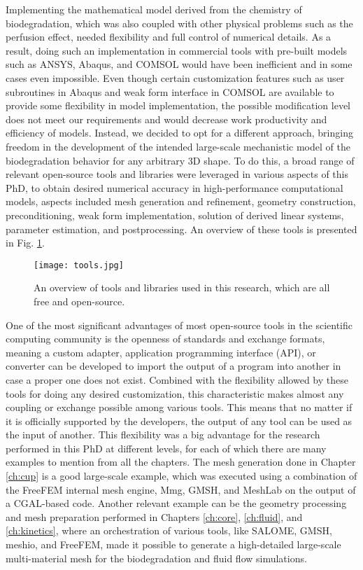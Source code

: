 Implementing the mathematical model derived from the chemistry of biodegradation, which was also coupled with other physical problems such as the perfusion effect, needed flexibility and full control of numerical details. As a result, doing such an implementation in commercial tools with pre-built models such as ANSYS, Abaqus, and COMSOL would have been inefficient and in some cases even impossible. Even though certain customization features such as user subroutines in Abaqus and weak form interface in COMSOL are available to provide some flexibility in model implementation, the possible modification level does not meet our requirements and would decrease work productivity and efficiency of models. Instead, we decided to opt for a different approach, bringing freedom in the development of the intended large-scale mechanistic model of the biodegradation behavior for any arbitrary 3D shape. To do this, a broad range of relevant open-source tools and libraries were leveraged in various aspects of this PhD, to obtain desired numerical accuracy in high-performance computational models, aspects included mesh generation and refinement, geometry construction, preconditioning, weak form implementation, solution of derived linear systems, parameter estimation, and postprocessing. An overview of these tools is presented in Fig. \ref{fig:conclusion_tools}.

\begin{figure}[h]
\centering
\medskip
\texttt{[image: tools.jpg]}
\caption[Overview of open-source tools and libraries used in this PhD]{An overview of tools and libraries used in this research, which are all free and open-source.} \label{fig:conclusion_tools}
\end{figure}


One of the most significant advantages of most open-source tools in the scientific computing community is the openness of standards and exchange formats, meaning a custom adapter, application programming interface (\gls{API}), or converter can be developed to import the output of a program into another in case a proper one does not exist. Combined with the flexibility allowed by these tools for doing any desired customization, this characteristic makes almost any coupling or exchange possible among various tools. This means that no matter if it is officially supported by the developers, the output of any tool can be used as the input of another. This flexibility was a big advantage for the research performed in this PhD at different levels, for each of which there are many examples to mention from all the chapters. The mesh generation done in Chapter \ref{ch:cup} is a good large-scale example, which was executed using a combination of the FreeFEM internal mesh engine, Mmg, GMSH, and MeshLab on the output of a CGAL-based code. Another relevant example can be the geometry processing and mesh preparation performed in Chapters \ref{ch:core}, \ref{ch:fluid}, and \ref{ch:kinetics}, where an orchestration of various tools, like SALOME, GMSH, meshio, and FreeFEM, made it possible to generate a high-detailed large-scale multi-material mesh for the biodegradation and fluid flow simulations.

